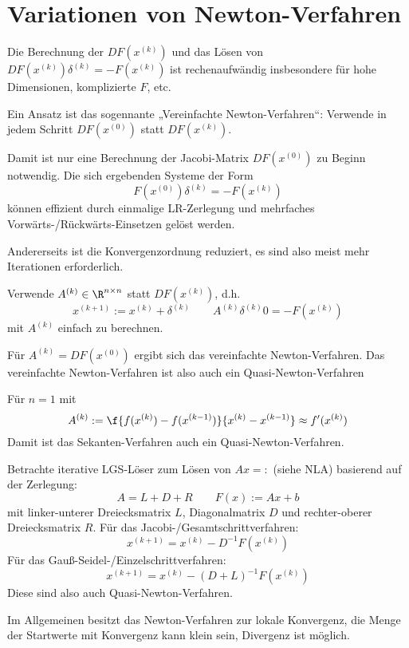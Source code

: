 \documentclass[11pt]{scrbook}
\begin{document}
\section{Variationen von Newton-Verfahren}

Die Berechnung der $DF(x^{(k)})$ und das Lösen von $DF(x^{(k)}) \delta^{(k)} = -F(x^{(k)})$ ist rechenaufwändig insbesondere für hohe Dimensionen, komplizierte $F$, etc.

\begin{seg}
	Ein Ansatz ist das sogennante „Vereinfachte Newton-Verfahren“:
	Verwende in jedem Schritt $DF(x^{(0)})$ statt $DF(x^{(k)})$.

	Damit ist nur eine Berechnung der Jacobi-Matrix $DF(x^{(0)})$ zu Beginn notwendig.
	Die sich ergebenden Systeme der Form 
	\[
		F(x^{(0)}) \delta^{(k)} = -F(x^{(k)})
	\]
	können effizient durch einmalige LR-Zerlegung und mehrfaches Vorwärts-/Rückwärts-Einsetzen gelöst werden.

	Andererseits ist die Konvergenzordnung reduziert, es sind also meist mehr Iterationen erforderlich.
\end{seg}

\begin{seg}
	Verwende $A^{(k)} \in \R^{n\times n}$ statt $DF(x^{(k)})$, d.h.
	\[
		x^{(k+1)} := x^{(k)} + \delta^{(k)}
		\qquad A^{(k)} \delta^{(k)}0= -F(x^{(k)})
	\]
	mit $A^{(k)}$ einfach zu berechnen.

	Für $A^{(k)} = DF(x^{(0)})$ ergibt sich das vereinfachte Newton-Verfahren.
	Das vereinfachte Newton-Verfahren ist also auch ein Quasi-Newton-Verfahren

	Für $n=1$ mit
	\[
		A^{(k)} := \f {f(x^{(k)}) - f(x^{(k-1)})}{x^{(k)} - x^{(k-1)}} \approx f'(x^{(k)})
	\]
	Damit ist das Sekanten-Verfahren auch ein Quasi-Newton-Verfahren.

	Betrachte iterative LGS-Löser zum Lösen von $Ax=:$ (siehe NLA) basierend auf der Zerlegung:
	\[
		A = L + D + R 
		\qquad F(x) := Ax + b
	\]
	mit linker-unterer Dreiecksmatrix $L$, Diagonalmatrix $D$ und rechter-oberer Dreiecksmatrix $R$.
	Für das Jacobi-/Gesamtschrittverfahren:
	\[
		x^{(k+1)} = x^{(k)} - D^{-1} F(x^{(k)})
	\]
	Für das Gauß-Seidel-/Einzelschrittverfahren:
	\[
		x^{(k+1)} = x^{(k)} - (D+L)^{-1} F(x^{(k)})
	\]
	Diese sind also auch Quasi-Newton-Verfahren.
\end{seg}

Im Allgemeinen besitzt das Newton-Verfahren zur lokale Konvergenz, die Menge der Startwerte mit Konvergenz kann klein sein, Divergenz ist möglich.
\end{document}
